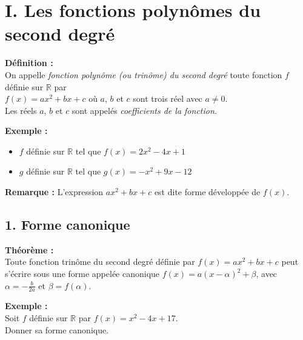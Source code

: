 \documentclass[11pt,a4paper]{article}
\title{\titre}
\author{\classe \\ \theme}
\date{}
\begin{document}
\maketitle
\pagestyle{custom}
\thispagestyle{custom}

\section*{I. Les fonctions polynômes du second degré}

\begin{mdframed}[style=definitionStyle]
	\textbf{Définition :} ~\\
	On appelle \emph{fonction polynôme (ou trinôme) du second degré} toute fonction $f$ définie sur $\mathbb{R}$ par ~\\
	$f(x)=ax^2+bx+c$ où $a$, $b$ et $c$ sont trois réel avec $a\not=0$. \\
	Les réels $a$, $b$ et $c$ sont appelés \emph{coefficients de la fonction.}
\end{mdframed}

\textbf{Exemple :}
\begin{itemize}
	\item $f$ définie sur $\mathbb{R}$ tel que $f(x)=2x^2-4x+1$
	\item $g$ définie sur $\mathbb{R}$ tel que $g(x)=-x^2+9x-12$
\end{itemize}

\textbf{Remarque :} L'expression $ax^2+bx+c$ est dite forme développée de $f(x)$.

\subsection*{1. Forme canonique}

\begin{mdframed}[style=proprieteStyle]
	\textbf{Théorème :} ~\\
	Toute fonction trinôme du second degré définie par $f(x)=ax^2+bx+c$ peut s'écrire sous une forme appelée
	canonique $f(x)=a(x-\alpha)^2+\beta$, avec $\alpha=-\frac{b}{2a}$ et $\beta=f(\alpha)$.
\end{mdframed}

\textbf{Exemple :} \\

Soit $f$ définie sur $\mathbb{R}$ par $f(x)=x^2-4x+17$. \\
Donner sa forme canonique.
\end{document}
